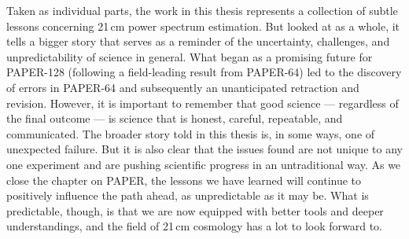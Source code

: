 Taken as individual parts, the work in this thesis represents a collection of subtle lessons concerning 21\,cm power spectrum estimation. But looked at as a whole, it tells a bigger story that serves as a reminder of the uncertainty, challenges, and unpredictability of science in general. What began as a promising future for PAPER-128 (following a field-leading result from PAPER-64) led to the discovery of errors in PAPER-64 and subsequently an unanticipated retraction and revision. However, it is important to remember that good science --- regardless of the final outcome --- is science that is honest, careful, repeatable, and communicated. The broader story told in this thesis is, in some ways, one of unexpected failure. But it is also clear that the issues found are not unique to any one experiment and are pushing scientific progress in an untraditional way. As we close the chapter on PAPER, the lessons we have learned will continue to positively influence the path ahead, as unpredictable as it may be. What is predictable, though, is that we are now equipped with better tools and deeper understandings, and the field of 21\,cm cosmology has a lot to look forward to. 




